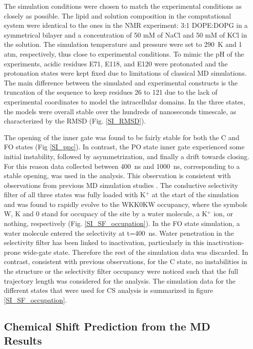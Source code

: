 \documentclass[%
 aip,
 amsmath,amssymb,
 preprint,%
]{revtex4-1}
\begin{document}
The simulation conditions were chosen to match the experimental conditions as closely as possible. The lipid and solution composition in the computational system were identical to the ones in the NMR experiment: 3:1 DOPE:DOPG in a symmetrical bilayer and a concentration of 50 mM of NaCl and 50 mM of KCl in the solution. The simulation temperature and pressure were set to \SI{290}{\kelvin} and 1 atm, respectively, thus close to experimental conditions. To mimic the pH of the experiments, acidic residues E71, E118, and E120 were protonated and the protonation states were kept fixed due to limitations of classical MD simulations. The main difference between the simulated and experimental constructs is the truncation of the sequence to keep residues 26 to 121 due to the lack of experimental coordinates to model the intracellular domains. In the three states, the models were overall stable over the hundreds of nanoseconds timescale, as characterized by the RMSD (Fig. \ref{SI_RMSD}).

The opening of the inner gate was found to be fairly stable for both the C and FO states (Fig \ref{SI_ppc}). In contrast, the PO state inner gate experienced some initial instability, followed by asymmetrization, and finally a drift towards closing. For this reason data collected between \SI{400}{\nano\second} and \SI{1000}{\nano\second}, corresponding to a stable opening, was used in the analysis. This observation is consistent with observations from previous MD simulation studies \cite{Li2018}. The conductive selectivity filter of all three states was fully loaded with K$^+$ at the start of the simulation and was found to rapidly evolve to the WKK0KW occupancy, where the symbols W, K and 0 stand for occupacy of the site by a water molecule, a K$^+$ ion, or nothing, respectively (Fig. \ref{SI_SF_occupation}). In the FO state simulation, a water molecule entered the selectivity at t=\SI{400}{\nano\second}. Water penetration in the selectivity filter has been linked to inactivation, particularly in this inactivation-prone wide-gate state\cite{Furini2020}. Therefore the rest of the simulation data was discarded. In contrast, consistent with previous observations\cite{Li2018}, for the C state, no instabilities in the structure or the selectivity filter occupancy were noticed such that the full trajectory length was considered for the analysis. The simulation data for the different states that were used for CS analysis is summarized in figure \ref{SI_SF_occupation}.

\subsection{Chemical Shift Prediction from the MD Results}
\end{document}
